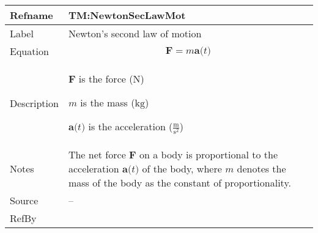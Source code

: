 \documentclass[12pt]{article}
\begin{document}
\begin{minipage}{\textwidth}
\begin{tabular}{>{\raggedright}p{}>{\raggedright\arraybackslash}p{}}
\toprule \textbf{Refname} & \textbf{TM:NewtonSecLawMot}
\label{TM:NewtonSecLawMot}
\\ \midrule
Label & Newton's second law of motion
        
\\ \midrule
Equation & \begin{displaymath}
           \symbf{F}=m \symbf{a}\text{(}t\text{)}
           \end{displaymath}
\\ \midrule
Description & \begin{symbDescription}
              \item{$\symbf{F}$ is the force (${\text{N}}$)}
              \item{$m$ is the mass (${\text{kg}}$)}
              \item{$\symbf{a}\text{(}t\text{)}$ is the acceleration ($\frac{\text{m}}{\text{s}^{2}}$)}
              \end{symbDescription}
\\ \midrule
Notes & The net force $\symbf{F}$ on a body is proportional to the acceleration $\symbf{a}\text{(}t\text{)}$ of the body, where $m$ denotes the mass of the body as the constant of proportionality.
        
\\ \midrule
Source & --
         
\\ \midrule
RefBy & 
\\ \bottomrule
\end{tabular}
\end{minipage}
\vspace{\baselineskip}
\noindent
\end{document}
